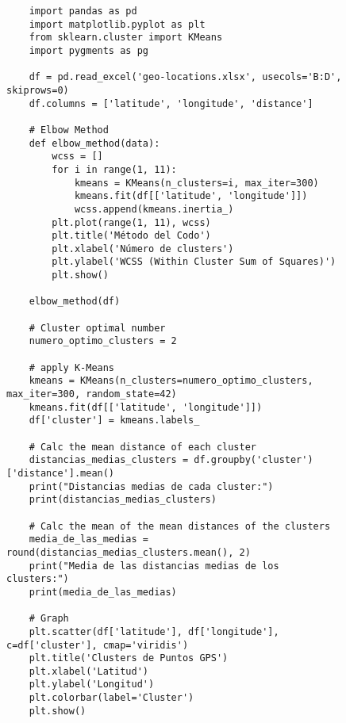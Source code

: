 \label{apendix:script-cluster-python}
\begin{figure}[H]
    \begin{verbatim}
    import pandas as pd
    import matplotlib.pyplot as plt
    from sklearn.cluster import KMeans
    import pygments as pg
    
    df = pd.read_excel('geo-locations.xlsx', usecols='B:D', skiprows=0)
    df.columns = ['latitude', 'longitude', 'distance']
    
    # Elbow Method
    def elbow_method(data):
        wcss = []
        for i in range(1, 11):
            kmeans = KMeans(n_clusters=i, max_iter=300)
            kmeans.fit(df[['latitude', 'longitude']])
            wcss.append(kmeans.inertia_)
        plt.plot(range(1, 11), wcss)
        plt.title('Método del Codo')
        plt.xlabel('Número de clusters')
        plt.ylabel('WCSS (Within Cluster Sum of Squares)')
        plt.show()
    
    elbow_method(df)
    
    # Cluster optimal number
    numero_optimo_clusters = 2
    
    # apply K-Means
    kmeans = KMeans(n_clusters=numero_optimo_clusters, max_iter=300, random_state=42)
    kmeans.fit(df[['latitude', 'longitude']])
    df['cluster'] = kmeans.labels_
    
    # Calc the mean distance of each cluster
    distancias_medias_clusters = df.groupby('cluster')['distance'].mean()
    print("Distancias medias de cada cluster:")
    print(distancias_medias_clusters)
    
    # Calc the mean of the mean distances of the clusters
    media_de_las_medias = round(distancias_medias_clusters.mean(), 2)
    print("Media de las distancias medias de los clusters:")
    print(media_de_las_medias)
    
    # Graph
    plt.scatter(df['latitude'], df['longitude'], c=df['cluster'], cmap='viridis')
    plt.title('Clusters de Puntos GPS')
    plt.xlabel('Latitud')
    plt.ylabel('Longitud')
    plt.colorbar(label='Cluster')
    plt.show()
    
    \end{verbatim}
\end{figure}
